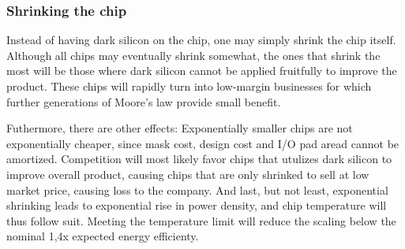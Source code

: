 
\subsubsection{Shrinking the chip}

Instead of having dark silicon on the chip, one may simply shrink the chip itself.
Although all chips may eventually shrink somewhat, the ones that shrink the most will be those where dark silicon cannot be applied fruitfully to improve the product.
These chips will rapidly turn into low-margin businesses for which further generations of Moore’s law provide small benefit.

Futhermore, there are other effects: Exponentially smaller chips are not exponentially cheaper, since mask cost, design cost and I/O pad aread cannot be amortized. 
Competition will most likely favor chips that utulizes dark silicon to improve overall product, causing chips that are only shrinked to sell at low market price, causing loss to the company.
And last, but not least, exponential shrinking leads to exponential rise in power density, and chip temperature will thus follow suit.
Meeting the temperature limit will reduce the scaling below the nominal 1,4x expected energy efficienty. \cite{dark-silicon}




